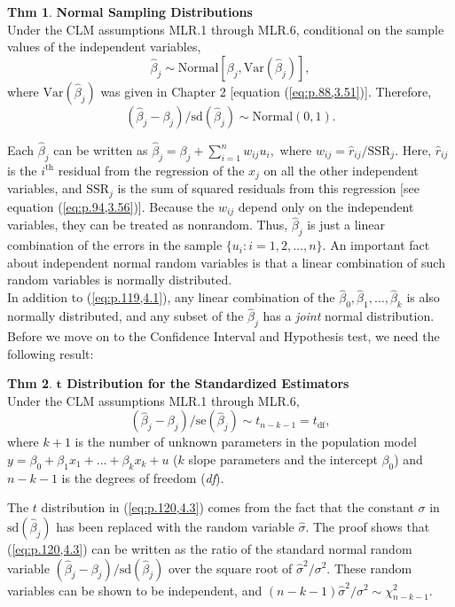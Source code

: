 \documentclass[a4paper, 10pt]{article}
\theoremstyle{definition}	%
\newtheorem{theorem}{Thm}
\begin{document}
\begin{theorem}
    \textbf{Normal Sampling Distributions}\\
    Under the CLM assumptions MLR.1 through MLR.6, conditional on the sample values of the independent variables,
    \begin{equation}
        \hat{\beta}_j \sim \text{Normal}[\beta_j, \text{Var}(\hat{\beta}_j)], \label{eq:p.119,4.1}
    \end{equation}
    where $\text{Var}(\hat{\beta}_j)$ was given in Chapter 2 [equation (\ref{eq:p.88,3.51})]. Therefore,
    \begin{equation*}
        (\hat{\beta}_j - \beta_j)/\text{sd}(\hat{\beta}_j) \sim \text{Normal}(0, 1).
    \end{equation*}
\end{theorem}
Each $\hat{\beta}_j$ can be written as $\hat{\beta}_j = \beta_j + \sum_{i=1}^n w_{ij} u_i,$ where $w_{ij} = \hat{r}_{ij} / \text{SSR}_j$. Here, $\hat{r}_{ij}$ is the $i^{\text{th}}$ residual from the regression of the $x_j$ on all the other independent variables, and $\text{SSR}_j$ is the sum of squared residuals from this regression [see equation (\ref{eq:p.94,3.56})]. Because the $w_{ij}$ depend only on the independent variables, they can be treated as nonrandom. Thus, $\hat{\beta}_j$ is just a linear combination of the errors in the sample $\{u_i : i = 1, 2, \dots, n\}$. An important fact about independent normal random variables is that a linear combination of such random variables is normally distributed.\\
In addition to (\ref{eq:p.119,4.1}), any  linear combination of the $\hat{\beta}_0, \hat{\beta}_1, \ldots, \hat{\beta}_k$ is also normally distributed, and any subset of the $\hat{\beta}_j$ has a \textit{joint} normal distribution. \\
Before we move on to the Confidence Interval and Hypothesis test, we need the following result:
\begin{theorem}
    \textbf{$\mathbf{t}$ Distribution for the Standardized Estimators}\\
    Under the CLM assumptions MLR.1 through MLR.6,
    \begin{equation}
        (\hat{\beta}_j - \beta_j)/\text{se}(\hat{\beta}_j) \sim t_{n-k-1} = t_{\text{df}}, \label{eq:p.120,4.3}
    \end{equation}
    where $k + 1$ is the number of unknown parameters in the population model $y = \beta_0 + \beta_1 x_1 + \dots + \beta_k x_k + u$ ($k$ slope parameters and the intercept $\beta_0$) and $n - k - 1$ is the degrees of freedom (\textit{df}).
\end{theorem}
The $t$ distribution in (\ref{eq:p.120,4.3}) comes from the fact that the constant $\sigma$ in $\text{sd}(\hat{\beta}_j)$ has been replaced with the random variable $\hat{\sigma}$.
The proof shows that (\ref{eq:p.120,4.3}) can be written as the ratio of the standard normal random variable $(\hat{\beta}_j - \beta_j)/\text{sd}(\hat{\beta}_j)$ over the square root of $\hat{\sigma}^2 / \sigma^2$. These random variables can be shown to be independent, and $(n - k - 1)\hat{\sigma}^2 / \sigma^2 \sim \chi^2_{n-k-1}.$
\end{document}
